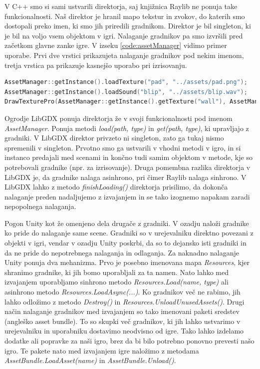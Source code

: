 \documentclass[12pt,a4paper,twoside]{book}
\begin{document}
V C++ smo si sami ustvarili direktorja, saj knjižnica Raylib ne ponuja take funkcionalnosti. Naš direktor je hranil mapo tekstur in zvokov, do katerih smo dostopali preko imen, ki smo jih priredili gradnikom. Direktor je bil singleton, ki je bil na voljo vsem objektom v igri. Nalaganje gradnikov pa smo izvršili pred začetkom glavne zanke igre. V izseku \ref{code:assetManager} vidimo primer uporabe. Prvi dve vrstici prikazujeta nalaganje gradnikov pod nekim imenom, tretja vrstica pa prikazuje kasnejšo uporabo pri izrisovanju. 

\begin{lstlisting}[label=code:assetManager, language=C++, caption=Uporaba direktorja gradnikov]
AssetManager::getInstance().loadTexture("pad", "../assets/pad.png");
AssetManager::getInstance().loadSound("blip", "../assets/blip.wav");
DrawTexturePro(AssetManager::getInstance().getTexture("wall"), AssetManager::getInstance().getRectangle("wall"), renderRectangle, Vector2{0, 0}, 0, BLUE);
\end{lstlisting}

Ogrodje LibGDX ponuja direktorja že v svoji funkcionalnosti pod imenom \textit{AssetManager}. Ponuja metodi \textit{load(path, type)} in \textit{get(path, type)}, ki upravljajo z gradniki. V LibGDX direktor privzeto ni singleton, zato ga tukaj nismo spremenili v singleton. Prvotno smo ga ustvarili v vhodni metodi v igro, in si instanco predajali med scenami in končno tudi samim objektom v metode, kje so potrebovali gradnike (npr. za izrisovanje). Druga pomembna razlika direktorja v LibGDX je, da gradnike nalaga asinhrono, pri čimer Raylib nalaga sinhrono. V LibGDX lahko z metodo \textit{finishLoading()} direktorja prisilimo, da dokonča nalaganje preden nadaljujemo z izvajanjem in se tako izognemo napakam zaradi nepopolnega nalaganja.

Pogon Unity kot že omenjeno dela drugače z gradniki. V ozadju naloži gradnike ko pride do nalaganje same scene. Gradniki so v urejevalniku direktno povezani z objekti v igri, vendar v ozadju Unity poskrbi, da so to dejansko isti gradniki in da ne pride do nepotrebnega nalaganja in odlaganja. Za naknadno nalaganje Unity ponuja dva mehanizma. Prvo je posebno imenovana mapa \textit{Resources}, kjer shranimo gradnike, ki jih bomo uporabljali za ta namen. Nato lahko med izvajanjem uporabljamo sinhrono metodo \textit{Resources.Load(name, type)} ali asinhrono metodo \textit{Resources.LoadAsync(...)}. Ko gradnikov več ne rabimo, jih lahko odložimo z metodo \textit{Destroy()} in \textit{Resources.UnloadUnusedAssets()}. Drugi način nalaganje gradnikov med izvajanjem so tako imenovani paketi sredstev (angleško asset bundle). To so skupki več gradnikov, ki jih lahko ustvarimo v urejevalniku in uporabniku dostavimo neodvisno od igre. Tako lahko izdelamo dodatke ali popravke za naši igro, brez da bi bilo potrebno ponovno prevesti našo igro. Te pakete nato med izvajanjem igre naložimo z metodama \textit{AssetBundle.LoadAsset(name)} in \textit{AssetBundle.Unload()}. 
\end{document}
